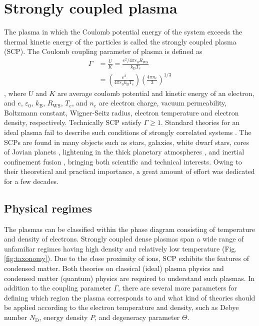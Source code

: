 
\chapter{Strongly coupled plasma}
\label{sec:ch3}

The plasma in which the Coulomb potential energy of the system exceeds the thermal kinetic energy of the particles is called the strongly coupled plasma (SCP). The Coulomb coupling parameter of plasma is defined as
\begin{equation}
\begin{aligned}
\Gamma &= \frac{U}{K}=\frac{e^{2} / 4 \pi \varepsilon_{0} R_\text{WS}}{k_\text{B} T_{e}} \\
&=\left(\frac{e^{2}}{4 \pi \varepsilon_{0} k_\text{B} T_{e}}\right)\left(\frac{4 \pi n_{e}}{3}\right)^{1 / 3}
\end{aligned}
\end{equation}
, where $U$ and $K$ are average coulomb potential and kinetic energy of an electron, and $e$, $\varepsilon_0$, $k_\text{B}$, $R_\text{WS}$, $T_e$, and $n_e$ are electron charge, vacuum permeability, Boltzmann constant, Wigner-Seitz radius, electron temperature and electron density, respectively. Technically SCP satisfy $\Gamma \geq 1$. Standard theories for an ideal plasma fail to describe such conditions of strongly correlated systems \cite{stanton2016ionic}. The SCPs are found in many objects such as stars, galaxies, white dwarf stars, cores of Jovian planets \cite{ichimaru1982strongly}, lightening in the thick planetary atmospheres \cite{cartier2020planetary}, and inertial confinement fusion \cite{remington2006experimental}, bringing both scientific and technical interests. Owing to their theoretical and practical importance, a great amount of effort was dedicated for a few decades.



\section{Physical regimes}
\label{sec:ch3-1}

The plasmas can be classified within the phase diagram consisting of temperature and density of electrons. Strongly coupled dense plasmas span a wide range of unfamiliar regimes having high density and relatively low temperature (Fig.\ref{fig:taxonomy}). Due to the close proximity of ions, SCP exhibits the features of condensed matter. Both theories on classical (ideal) plasma physics and condensed matter (quantum) physics are required to understand such plasmas. In addition to the coupling parameter $\Gamma$, there are several more parameters for defining which region the plasma corresponds to and what kind of theories should be applied according to the electron temperature and density, such as Debye number $N_\text{D}$, energy density $P$, and degeneracy parameter $\Theta$.

